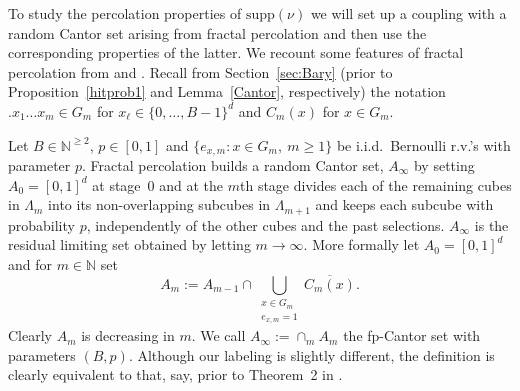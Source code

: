 \documentclass[12pt]{article}
\numberwithin{theorem}{section}
\theoremstyle{def}
\numberwithin{equation}{section}
\renewcommand{\P}{\mathbb{P}}
\newcommand{\N}{\mathbb{N}}
\newcommand{\cG}{\mathcal G}
\newcommand{\supp}{\mathrm{supp}}
\begin{document}
To study the percolation properties of $\supp(\nu)$ we will set up a coupling with a random Cantor set arising from fractal percolation and then use the corresponding properties of the latter. We recount some features of fractal percolation from \cite{CCD88} and \cite{FG92}. Recall from Section~\ref{sec:Bary} (prior to Proposition~\ref{hitprob1} and Lemma~\ref{Cantor}, respectively) the notation $.x_1\dots x_m\in G_m$ for $x_\ell\in\{0,\dots,B-1\}^d$ and $C_m(x)$ for $x\in G_m$. 

Let $B\in \N^{\ge 2}$, $p\in[0,1]$ and $\{e_{x,m}: x\in G_m, \ m\geq 1\}$ be i.i.d.\ Bernoulli r.v.'s with parameter $p$.  
Fractal percolation builds a random Cantor set, $A_\infty$ by setting $A_0=[0,1]^d$ at stage~$0$ and at the $m$th stage divides each of the remaining cubes in $\Lambda_m$ into its non-overlapping subcubes in $\Lambda_{m+1}$ and keeps each subcube with probability $p$, independently of the other cubes and the past selections.  
$A_\infty$ is the residual limiting set obtained by letting $m\to\infty$. More formally let $A_0=[0,1]^d$ and for $m\in\N$ set 
\begin{equation*}
	A_m:=A_{m-1}\cap \bigcup_{\substack{x \in G_m\\ e_{x,m}=1}} \overline{C_m(x)}.
\end{equation*}
Clearly $A_m$ is decreasing in $m$. We call $A_\infty:=\cap_m A_m$ the fp-Cantor set with parameters $(B,p)$. Although our labeling is slightly different, the definition is clearly equivalent to that, say, prior to Theorem~2 in \cite{FG92}. 
\end{document}
